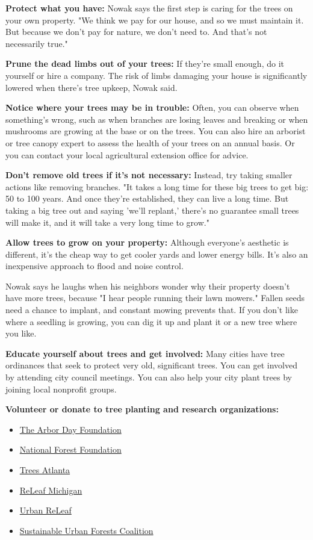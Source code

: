 \textbf{Protect what you have:} Nowak says the first step is caring for
the trees on your own property. "We think we pay for our house, and so
we must maintain it. But because we don't pay for nature, we don't need
to. And that's not necessarily true."

\textbf{Prune the dead limbs out of your trees:} If they're small
enough, do it yourself or hire a company. The risk of limbs damaging
your house is significantly lowered when there's tree upkeep, Nowak
said.

\textbf{Notice where your trees may be in trouble:} Often, you can
observe when something's wrong, such as when branches are losing leaves
and breaking or when mushrooms are growing at the base or on the trees.
You can also hire an arborist or tree canopy expert to assess the health
of your trees on an annual basis. Or you can contact your local
agricultural extension office for advice.

\textbf{Don't remove old trees if it's not necessary:} Instead, try
taking smaller actions like removing branches. "It takes a long time for
these big trees to get big: 50 to 100 years. And once they're
established, they can live a long time. But taking a big tree out and
saying 'we'll replant,' there's no guarantee small trees will make it,
and it will take a very long time to grow."

\textbf{Allow trees to grow on your property:} Although everyone's
aesthetic is different, it's the cheap way to get cooler yards and lower
energy bills. It's also an inexpensive approach to flood and noise
control.

Nowak says he laughs when his neighbors wonder why their property
doesn't have more trees, because "I hear people running their lawn
mowers." Fallen seeds need a chance to implant, and constant mowing
prevents that. If you don't like where a seedling is growing, you can
dig it up and plant it or a new tree where you like.

\textbf{Educate yourself about trees and get involved:} Many cities have
tree ordinances that seek to protect very old, significant trees. You
can get involved by attending city council meetings. You can also help
your city plant trees by joining local nonprofit groups.

\textbf{Volunteer or donate to tree planting and research
organizations:}

\begin{itemize}
\tightlist
\item
  \href{https://www.arborday.org/}{The Arbor Day Foundation}
\item
  \href{https://www.nationalforests.org/}{National Forest Foundation}
\item
  \href{https://treesatlanta.org/}{Trees Atlanta}
\item
  \href{https://www.releafmichigan.org/}{ReLeaf Michigan}
\item
  \href{http://www.urbanreleaf.org/}{Urban ReLeaf}
\item
  \href{https://sufc.org/}{Sustainable Urban Forests Coalition}
\end{itemize}

